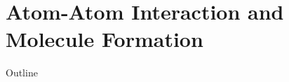 \documentclass{beamer}
\begin{document}
\section{Atom-Atom Interaction and Molecule Formation}

\begin{frame}{Outline}
  \tableofcontents[currentsection]
\end{frame}



\end{document}
